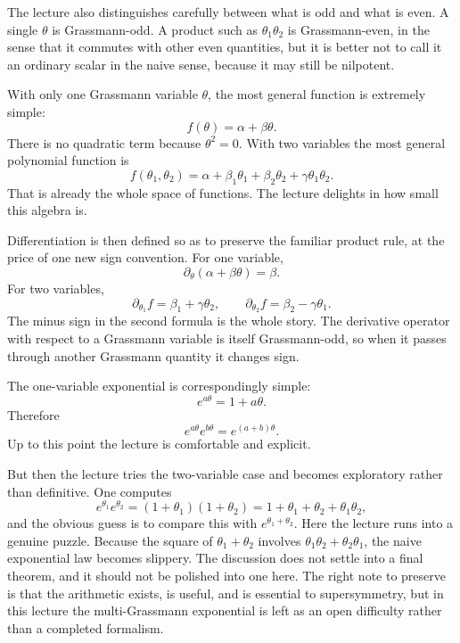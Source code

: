 The lecture also distinguishes carefully between what is odd and what is even. A single \(\theta\) is Grassmann-odd. A product such as \(\theta_1\theta_2\) is Grassmann-even, in the sense that it commutes with other even quantities, but it is better not to call it an ordinary scalar in the naive sense, because it may still be nilpotent.

With only one Grassmann variable \(\theta\), the most general function is extremely simple:
\begin{equation}
f(\theta)=\alpha+\beta\theta.
\end{equation}
There is no quadratic term because \(\theta^2=0\). With two variables the most general polynomial function is
\begin{equation}
f(\theta_1,\theta_2)=\alpha+\beta_1\theta_1+\beta_2\theta_2+\gamma\theta_1\theta_2.
\end{equation}
That is already the whole space of functions. The lecture delights in how small this algebra is.

Differentiation is then defined so as to preserve the familiar product rule, at the price of one new sign convention. For one variable,
\begin{equation}
\partial_\theta(\alpha+\beta\theta)=\beta.
\end{equation}
For two variables,
\begin{equation}
\partial_{\theta_1}f=\beta_1+\gamma\theta_2,
\qquad
\partial_{\theta_2}f=\beta_2-\gamma\theta_1.
\end{equation}
The minus sign in the second formula is the whole story. The derivative operator with respect to a Grassmann variable is itself Grassmann-odd, so when it passes through another Grassmann quantity it changes sign.

The one-variable exponential is correspondingly simple:
\begin{equation}
e^{a\theta}=1+a\theta.
\end{equation}
Therefore
\begin{equation}
e^{a\theta}e^{b\theta}=e^{(a+b)\theta}.
\end{equation}
Up to this point the lecture is comfortable and explicit.

But then the lecture tries the two-variable case and becomes exploratory rather than definitive. One computes
\begin{equation}
e^{\theta_1}e^{\theta_2}=(1+\theta_1)(1+\theta_2)=1+\theta_1+\theta_2+\theta_1\theta_2,
\end{equation}
and the obvious guess is to compare this with \(e^{\theta_1+\theta_2}\). Here the lecture runs into a genuine puzzle. Because the square of \(\theta_1+\theta_2\) involves \(\theta_1\theta_2+\theta_2\theta_1\), the naive exponential law becomes slippery. The discussion does not settle into a final theorem, and it should not be polished into one here. The right note to preserve is that the arithmetic exists, is useful, and is essential to supersymmetry, but in this lecture the multi-Grassmann exponential is left as an open difficulty rather than a completed formalism.

